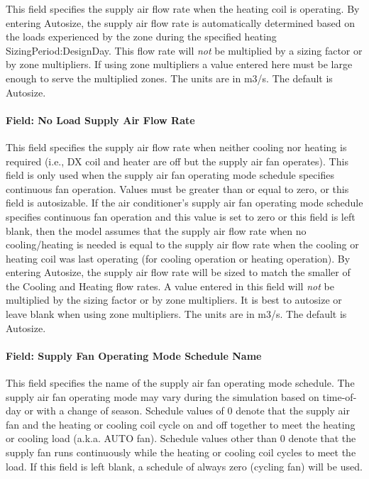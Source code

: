 This field specifies the supply air flow rate when the heating coil is operating. By entering Autosize, the supply air flow rate is automatically determined based on the loads experienced by the zone during the specified heating SizingPeriod:DesignDay. This flow rate will \emph{not} be multiplied by a sizing factor or by zone multipliers. If using zone multipliers a value entered here must be large enough to serve the multiplied zones. The units are in m3/s. The default is Autosize.

\paragraph{Field: No Load Supply Air Flow Rate}\label{field-no-load-supply-air-flow-rate-3}

This field specifies the supply air flow rate when neither cooling nor heating is required (i.e., DX coil and heater are off but the supply air fan operates). This field is only used when the supply air fan operating mode schedule specifies continuous fan operation. Values must be greater than or equal to zero, or this field is autosizable. If the air conditioner's supply air fan operating mode schedule specifies continuous fan operation and this value is set to zero or this field is left blank, then the model assumes that the supply air flow rate when no cooling/heating is needed is equal to the supply air flow rate when the cooling or heating coil was last operating (for cooling operation or heating operation). By entering Autosize, the supply air flow rate will be sized to match the smaller of the Cooling and Heating flow rates. A value entered in this field will \emph{not} be multiplied by the sizing factor or by zone multipliers. It is best to autosize or leave blank when using zone multipliers. The units are in m3/s. The default is Autosize.

\paragraph{Field: Supply Fan Operating Mode Schedule Name}\label{field-supply-fan-operating-mode-schedule-name-5}

This field specifies the name of the supply air fan operating mode schedule. The supply air fan operating mode may vary during the simulation based on time-of-day or with a change of season. Schedule values of 0 denote that the supply air fan and the heating or cooling coil cycle on and off together to meet the heating or cooling load (a.k.a. AUTO fan). Schedule values other than 0 denote that the supply fan runs continuously while the heating or cooling coil cycles to meet the load. If this field is left blank, a schedule of always zero (cycling fan) will be used.


